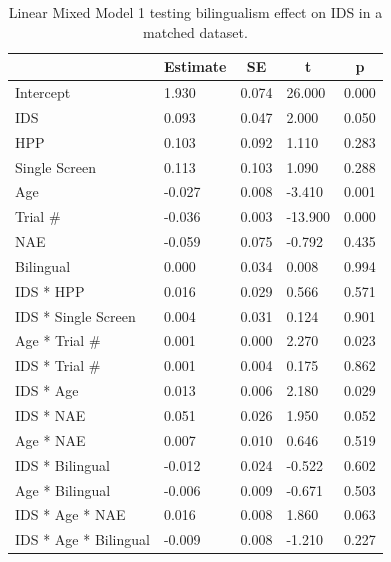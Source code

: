 \documentclass[,man,floatsintext]{apa6}
\begin{document}
\begin{table}[tbp]

\begin{center}
\begin{threeparttable}

\caption{\label{tab:unnamed-chunk-8}Linear Mixed Model 1 testing bilingualism effect on IDS in a matched dataset.}

\begin{tabular}{lllll}
\toprule
 & \multicolumn{1}{c}{Estimate} & \multicolumn{1}{c}{SE} & \multicolumn{1}{c}{t} & \multicolumn{1}{c}{p}\\
\midrule
Intercept & 1.930 & 0.074 & 26.000 & 0.000\\
IDS & 0.093 & 0.047 & 2.000 & 0.050\\
HPP & 0.103 & 0.092 & 1.110 & 0.283\\
Single Screen & 0.113 & 0.103 & 1.090 & 0.288\\
Age & -0.027 & 0.008 & -3.410 & 0.001\\
Trial \# & -0.036 & 0.003 & -13.900 & 0.000\\
NAE & -0.059 & 0.075 & -0.792 & 0.435\\
Bilingual & 0.000 & 0.034 & 0.008 & 0.994\\
IDS * HPP & 0.016 & 0.029 & 0.566 & 0.571\\
IDS * Single Screen & 0.004 & 0.031 & 0.124 & 0.901\\
Age * Trial \# & 0.001 & 0.000 & 2.270 & 0.023\\
IDS * Trial \# & 0.001 & 0.004 & 0.175 & 0.862\\
IDS * Age & 0.013 & 0.006 & 2.180 & 0.029\\
IDS * NAE & 0.051 & 0.026 & 1.950 & 0.052\\
Age * NAE & 0.007 & 0.010 & 0.646 & 0.519\\
IDS * Bilingual & -0.012 & 0.024 & -0.522 & 0.602\\
Age * Bilingual & -0.006 & 0.009 & -0.671 & 0.503\\
IDS * Age * NAE & 0.016 & 0.008 & 1.860 & 0.063\\
IDS * Age * Bilingual & -0.009 & 0.008 & -1.210 & 0.227\\
\bottomrule
\end{tabular}

\end{threeparttable}
\end{center}

\end{table}
\end{document}
